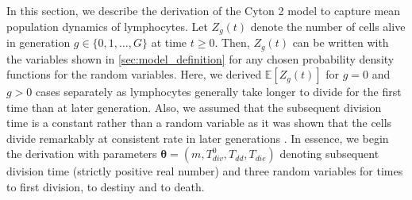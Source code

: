 \documentclass[11pt, a4paper]{article}
\begin{document}
\linenumbers
\noindent
In this section, we describe the derivation of the Cyton 2 model to capture mean population dynamics of lymphocytes. Let $Z_g(t)$ denote the number of cells alive in generation $g \in \{0,1,\dots,G\}$ at time $t \geq 0$. Then, $Z_g(t)$ can be written with the variables shown in \cref{sec:model_definition} for any chosen probability density functions for the random variables. Here, we derived $\mathbb{E}[Z_g(t)]$ for $g=0$ and $g>0$ cases separately as lymphocytes generally take longer to divide for the first time than at later generation. Also, we assumed that the subsequent division time is a constant rather than a random variable as it was shown that the cells divide remarkably at consistent rate in later generations \parencite{Gett.2000, Gett.1998}. In essence, we begin the derivation with parameters $\boldsymbol{\theta} = (m, T_{div}^0, T_{dd}, T_{die})$ denoting subsequent division time (strictly positive real number) and three random variables for times to first division, to destiny and to death.

\nolinenumbers
\end{document}
